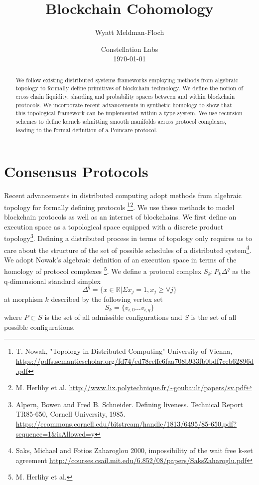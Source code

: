 \documentclass{article}
\title{Blockchain Cohomology}
\author{Wyatt Meldman-Floch}
\date{%
    Constellation Labs\\%
    \today}
\begin{document}
\maketitle

\begin{abstract}
We follow existing distributed systems frameworks employing methods from algebraic topology to formally define primitives of blockchain technology. We define the notion of cross chain liquidity, sharding and probability spaces between and within blockchain protocols. We incorporate recent advancements in synthetic homology to show that this topological framework can be implemented within a type system. We use recursion schemes to define kernels admitting smooth manifolds across protocol complexes, leading to the formal definition of a Poincare protocol.

\end{abstract}

\section{Consensus Protocols}
Recent advancements in distributed computing adopt methods from algebraic topology for formally defining protocols \footnote{T. Nowak, "Topology in Distributed Computing" University of Vienna, \url{https://pdfs.semanticscholar.org/fd74/ed78ccffc6faa708b933fb0bdf7ceb62896d.pdf}}\footnote{M. Herlihy et al. \url{http://www.lix.polytechnique.fr/~goubault/papers/sv.pdf}}. We use these methods to model blockchain protocols as well as an internet of blockchains. We first define an execution space as a topological space equipped with a discrete product topology\footnote{Alpern, Bowen and Fred B. Schneider. Defining liveness. Technical Report TR85-650,
Cornell University, 1985. \url{https://ecommons.cornell.edu/bitstream/handle/1813/6495/85-650.pdf?sequence=1&isAllowed=y}}. Defining a distributed process in terms of topology only requires us to care about the structure of the set of possible schedules of a distributed system\footnote{Saks, Michael and Fotios Zaharoglou 2000, impossibility of the wait free k-set agreement \url{http://courses.csail.mit.edu/6.852/08/papers/SaksZaharoglu.pdf}}. We adopt Nowak's algebraic definition of an execution space in terms of the homology of protocol complexes \footnote{M. Herlihy et al.}. We define a protocol complex $S_k: P_k{\Delta^q}$ as the q-dimensional standard simplex
\begin{equation} \label{eq1}
\Delta^q = \{x \in \mathbb{R} | \Sigma x_j = 1, x_j \geq \forall j \}
\end{equation} \label{eq1}
at morphism $k$ described by the following vertex set
\begin{equation} \label{eq1}
S_k = \{v_{i,0} \dots v_{i,q}\}
\end{equation} \label{eq1}
where $P \subset S$ is the set of all admissible configurations and $S$ is the set of all possible configurations.
 
\end{document}
